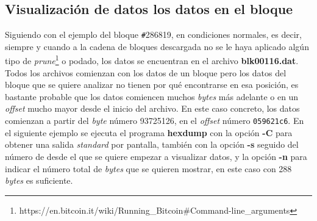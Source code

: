 \documentclass{article}
\begin{document}
    \subsection{Visualización de datos los datos en el bloque}
    Siguiendo con el ejemplo del bloque \texttt{\#}286819, en condiciones normales, es decir, siempre y cuando a la cadena de bloques descargada no se le haya aplicado algún tipo de \textit{prune}\footnote{https://en.bitcoin.it/wiki/Running\_Bitcoin\#Command-line\_arguments} o podado, los datos se encuentran en el archivo \textbf{blk00116.dat}. Todos los archivos comienzan con los datos de un bloque pero los datos del bloque que se quiere analizar no tienen por qué encontrarse en esa posición, es bastante probable que los datos comiencen muchos \textit{bytes} más adelante o en un \textit{offset} mucho mayor desde el inicio del archivo. En este caso concreto, los datos comienzan a partir del \textit{byte} número 93725126, en el \textit{offset} número \texttt{059621c6}. En el siguiente ejemplo se ejecuta el programa \textbf{hexdump} con la opción \textbf{-C} para obtener una salida \textit{standard} por pantalla, también con la opción \textbf{-s} seguido del número de  desde el que se quiere empezar a visualizar datos, y la opción \textbf{-n} para indicar el número total de \textit{bytes} que se quieren mostrar, en este caso con 288 \textit{bytes} es suficiente.
\end{document}
